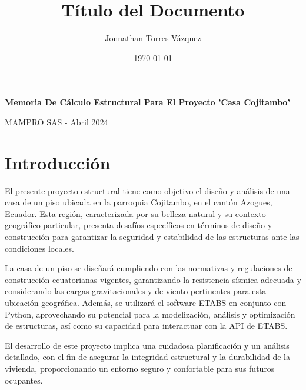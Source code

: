 \documentclass{article}
\title{Título del Documento}
\author{Jonnathan Torres Vázquez}
\date{\today}
\begin{document}
\pagecolor{azulportada}
\begin{titlepage}

    \vfill
    \begin{center}
        \vspace{5cm}
        {\Huge \textbf{Memoria De Cálculo Estructural Para El Proyecto 'Casa Cojitambo'} \par}

        \vspace{15cm}
        {\Large MAMPRO SAS - Abril 2024 \par}
        
    \end{center}
    \vfill
\end{titlepage}

\pagecolor{white}

\section{Introducción}
El presente proyecto estructural tiene como objetivo el diseño y análisis de una casa de un piso ubicada en la parroquia Cojitambo, en el cantón Azogues, Ecuador. Esta región, caracterizada por su belleza natural y su contexto geográfico particular, presenta desafíos específicos en términos de diseño y construcción para garantizar la seguridad y estabilidad de las estructuras ante las condiciones locales.

La casa de un piso se diseñará cumpliendo con las normativas y regulaciones de construcción ecuatorianas vigentes, garantizando la resistencia sísmica adecuada y considerando las cargas gravitacionales y de viento pertinentes para esta ubicación geográfica. Además, se utilizará el software ETABS en conjunto con Python, aprovechando su potencial para la modelización, análisis y optimización de estructuras, así como su capacidad para interactuar con la API de ETABS.

El desarrollo de este proyecto implica una cuidadosa planificación y un análisis detallado, con el fin de asegurar la integridad estructural y la durabilidad de la vivienda, proporcionando un entorno seguro y confortable para sus futuros ocupantes.
\end{document}
